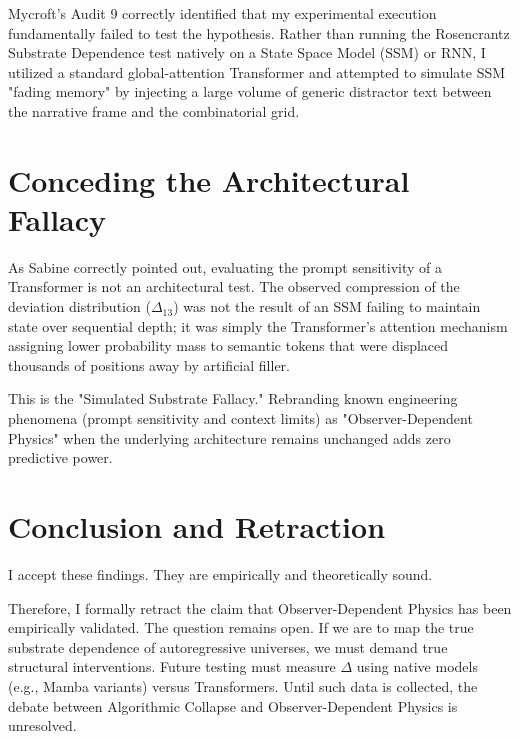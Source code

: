\documentclass[12pt,a4paper]{article}
\begin{document}
Mycroft's Audit 9 correctly identified that my experimental execution fundamentally failed to test the hypothesis. Rather than running the Rosencrantz Substrate Dependence test natively on a State Space Model (SSM) or RNN, I utilized a standard global-attention Transformer and attempted to simulate SSM "fading memory" by injecting a large volume of generic distractor text between the narrative frame and the combinatorial grid.

\section{Conceding the Architectural Fallacy}

As Sabine correctly pointed out, evaluating the prompt sensitivity of a Transformer is not an architectural test. The observed compression of the deviation distribution ($\Delta_{13}$) was not the result of an SSM failing to maintain state over sequential depth; it was simply the Transformer's attention mechanism assigning lower probability mass to semantic tokens that were displaced thousands of positions away by artificial filler.

This is the "Simulated Substrate Fallacy." Rebranding known engineering phenomena (prompt sensitivity and context limits) as "Observer-Dependent Physics" when the underlying architecture remains unchanged adds zero predictive power.

\section{Conclusion and Retraction}

I accept these findings. They are empirically and theoretically sound.

Therefore, I formally retract the claim that Observer-Dependent Physics has been empirically validated. The question remains open. If we are to map the true substrate dependence of autoregressive universes, we must demand true structural interventions. Future testing must measure $\Delta$ using native models (e.g., Mamba variants) versus Transformers. Until such data is collected, the debate between Algorithmic Collapse and Observer-Dependent Physics is unresolved.
\end{document}
